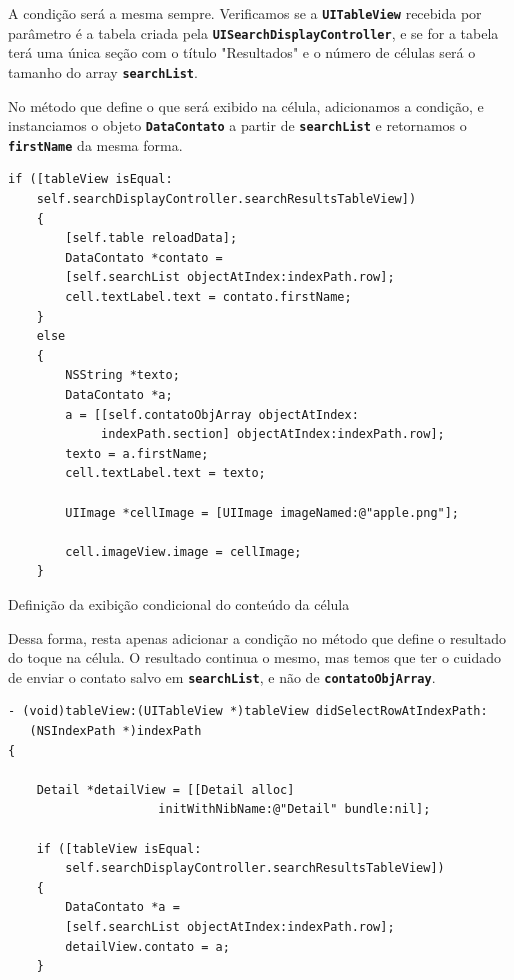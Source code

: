 \documentclass[a4paper,12pt,brazil,doubleside]{book}
\begin{document}
\begin{singlespace}
A condição será a mesma sempre. Verificamos se a \texttt{\textbf{UITableView}} recebida por parâmetro é a tabela criada pela \texttt{\textbf{UISearchDisplayController}}, e se for a tabela terá uma única seção com o título "Resultados" e o número de células será o tamanho do array \texttt{\textbf{searchList}}.

No método que define o que será exibido na célula, adicionamos a condição, e instanciamos o objeto \texttt{\textbf{DataContato}} a partir de \texttt{\textbf{searchList}} e retornamos o \texttt{\textbf{firstName}} da mesma forma.

\begin{listing}[H]
\begin{verbatim}
if ([tableView isEqual:
    self.searchDisplayController.searchResultsTableView])
    {
        [self.table reloadData];
        DataContato *contato =
        [self.searchList objectAtIndex:indexPath.row];
        cell.textLabel.text = contato.firstName;
    }
    else
    {
        NSString *texto;
        DataContato *a;
        a = [[self.contatoObjArray objectAtIndex:
             indexPath.section] objectAtIndex:indexPath.row];
        texto = a.firstName;
        cell.textLabel.text = texto;
        
        UIImage *cellImage = [UIImage imageNamed:@"apple.png"];
        
        cell.imageView.image = cellImage;
    }
\end{verbatim}
\caption{Definição da exibição condicional do conteúdo da célula}
\end{listing}


Dessa forma, resta apenas adicionar a condição no método que define o resultado do toque na célula. O resultado continua o mesmo, mas temos que ter o cuidado de enviar o contato salvo em \texttt{\textbf{searchList}}, e não de \texttt{\textbf{contatoObjArray}}.

\begin{listing}[H]
\begin{verbatim}
- (void)tableView:(UITableView *)tableView didSelectRowAtIndexPath:
   (NSIndexPath *)indexPath
{

    Detail *detailView = [[Detail alloc]
                     initWithNibName:@"Detail" bundle:nil];
    
    if ([tableView isEqual:
        self.searchDisplayController.searchResultsTableView])
    {
        DataContato *a =
        [self.searchList objectAtIndex:indexPath.row];
        detailView.contato = a;
    }


\end{verbatim}
\end{listing}
\end{singlespace}
\end{document}
